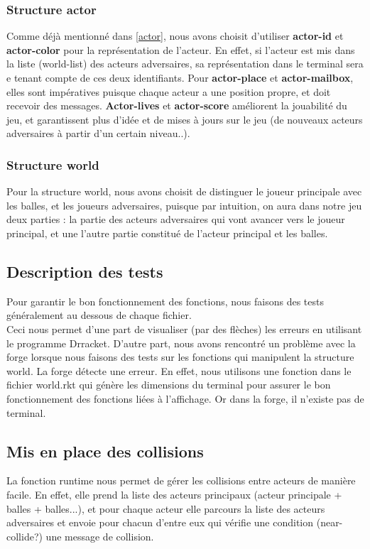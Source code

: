 \documentclass[a4paper]{article}
\begin{document}
\subsubsection{Structure actor}
Comme déjà mentionné dans \ref{actor}, nous avons choisit d'utiliser \textbf{actor-id} et \textbf{actor-color} pour la représentation de l'acteur. En effet, si l'acteur est mis dans la liste (world-list) des acteurs adversaires, sa représentation dans le terminal sera e tenant compte de ces deux identifiants. Pour \textbf{actor-place} et \textbf{actor-mailbox}, elles sont impératives puisque chaque acteur a une position propre, et doit recevoir des messages. \textbf{Actor-lives} et \textbf{actor-score} améliorent la jouabilité du jeu, et garantissent plus d'idée et de mises à jours sur le jeu (de nouveaux acteurs adversaires à partir d'un certain niveau..).


\subsubsection{Structure world}
Pour la structure world, nous avons choisit de distinguer le joueur principale avec les balles, et les joueurs adversaires, puisque par intuition, on aura dans notre jeu deux parties : la partie des acteurs adversaires qui vont avancer vers le joueur principal, et une l'autre partie constitué de l'acteur principal et les balles.

\subsection{Description des tests}
Pour garantir le bon fonctionnement des fonctions, nous faisons des tests généralement au dessous de chaque fichier. \\
Ceci nous permet d'une part de visualiser (par des flèches) les erreurs en utilisant le programme Drracket. D'autre part, nous avons rencontré un problème avec la forge lorsque nous faisons des tests sur les fonctions qui manipulent la structure world. La forge détecte une erreur. En effet, nous utilisons une fonction dans le fichier world.rkt qui génère les dimensions du terminal pour assurer le bon fonctionnement des fonctions liées à l'affichage. Or dans la forge, il n'existe pas de terminal.  

\subsection{Mis en place des collisions}
La fonction runtime nous permet de gérer les collisions entre acteurs de manière facile. En effet, elle prend la liste des acteurs principaux (acteur principale + balles + balles...), et pour chaque acteur elle parcours la liste des acteurs adversaires et envoie pour chacun d'entre eux qui vérifie une condition (near-collide?) une message de collision. 
\end{document}
